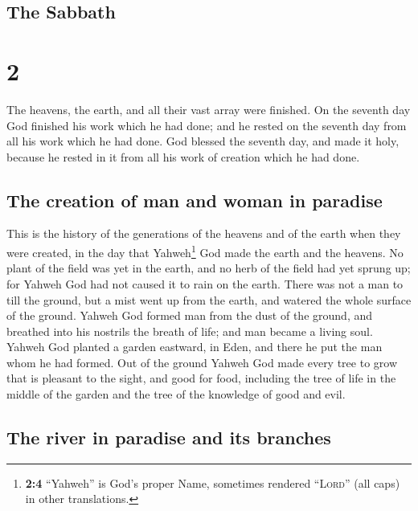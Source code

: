 \begin{paracol}{2}
\begin{otherlanguage}{english}
\hypertarget{the-sabbath}{%
\subsection{The Sabbath}\label{the-sabbath}}

\hypertarget{section-3}{%
\section{2}\label{section-3}}

 The heavens, the earth, and all their vast array were
finished.  On the seventh day God finished his work which
he had done; and he rested on the seventh day from all his work which he
had done.  God blessed the seventh day, and made it holy,
because he rested in it from all his work of creation which he had done.

\hypertarget{the-creation-of-man-and-woman-in-paradise}{%
\subsection{The creation of man and woman in
paradise}\label{the-creation-of-man-and-woman-in-paradise}}

 This is the history of the generations of the heavens and
of the earth when they were created, in the day that Yahweh\footnote{\textbf{2:4}
  ``Yahweh'' is God's proper Name, sometimes rendered ``\textsc{Lord}''
  (all caps) in other translations.} God made the earth and the heavens.
 No plant of the field was yet in the earth, and no herb
of the field had yet sprung up; for Yahweh God had not caused it to rain
on the earth. There was not a man to till the ground,  but
a mist went up from the earth, and watered the whole surface of the
ground.  Yahweh God formed man from the dust of the
ground, and breathed into his nostrils the breath of life; and man
became a living soul.  Yahweh God planted a garden
eastward, in Eden, and there he put the man whom he had formed.
 Out of the ground Yahweh God made every tree to grow that
is pleasant to the sight, and good for food, including the tree of life
in the middle of the garden and the tree of the knowledge of good and
evil.

\hypertarget{the-river-in-paradise-and-its-branches}{%
\subsection{The river in paradise and its
branches}\label{the-river-in-paradise-and-its-branches}}


\end{otherlanguage}
\end{paracol}
